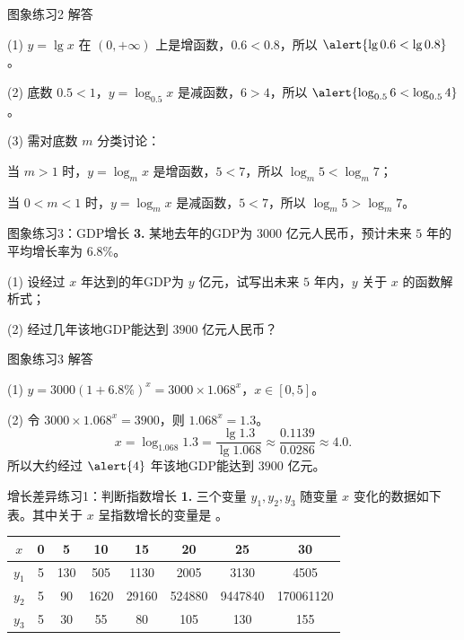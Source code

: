 \documentclass[10pt,aspectratio=169,serif]{beamer}
\begin{document}
\begin{frame}[t]{图象练习2 解答}
\begin{tcolorbox}[colback=orange!10,colframe=orange,title=\textbf{解}]
(1) $y=\lg x$ 在 $(0,+\infty)$ 上是增函数，$0.6<0.8$，所以 $\alert{\lg 0.6 < \lg 0.8}$。

(2) 底数 $0.5<1$，$y=\log_{0.5} x$ 是减函数，$6>4$，所以 $\alert{\log_{0.5} 6 < \log_{0.5} 4}$。

(3) 需对底数 $m$ 分类讨论：

\hspace{2em}当 $m>1$ 时，$y=\log_m x$ 是增函数，$5<7$，所以 $\log_m 5 < \log_m 7$；

\hspace{2em}当 $0<m<1$ 时，$y=\log_m x$ 是减函数，$5<7$，所以 $\log_m 5 > \log_m 7$。
\end{tcolorbox}
\end{frame}

\begin{frame}[t]{图象练习3：GDP增长}
\textbf{3.} 某地去年的GDP为 $3000$ 亿元人民币，预计未来 $5$ 年的平均增长率为 $6.8\%$。

\vspace{0.5em}
(1) 设经过 $x$ 年达到的年GDP为 $y$ 亿元，试写出未来 $5$ 年内，$y$ 关于 $x$ 的函数解析式；

(2) 经过几年该地GDP能达到 $3900$ 亿元人民币？
\end{frame}

\begin{frame}[t]{图象练习3 解答}
\begin{tcolorbox}[colback=orange!10,colframe=orange,title=\textbf{解}]
(1) $y = 3000(1+6.8\%)^x = 3000\times 1.068^x$，$x\in [0, 5]$。

(2) 令 $3000\times 1.068^x = 3900$，则 $1.068^x = 1.3$。
\[
x = \log_{1.068} 1.3 = \frac{\lg 1.3}{\lg 1.068} \approx \frac{0.1139}{0.0286} \approx 4.0.
\]
所以大约经过 $\alert{4}$ 年该地GDP能达到 $3900$ 亿元。
\end{tcolorbox}
\end{frame}

\begin{frame}[t]{增长差异练习1：判断指数增长}
\textbf{1.} 三个变量 $y_1, y_2, y_3$ 随变量 $x$ 变化的数据如下表。其中关于 $x$ 呈指数增长的变量是 \underline{\hspace{2em}}。

\vspace{0.5em}
\begin{center}
\begin{tabular}{c|ccccccc}
$x$ & 0 & 5 & 10 & 15 & 20 & 25 & 30\\
\hline
$y_1$ & 5 & 130 & 505 & 1130 & 2005 & 3130 & 4505\\
$y_2$ & 5 & 90 & 1620 & 29160 & 524880 & 9447840 & 170061120\\
$y_3$ & 5 & 30 & 55 & 80 & 105 & 130 & 155
\end{tabular}
\end{center}
\end{frame}
\end{document}
